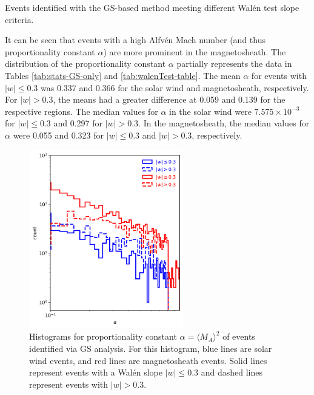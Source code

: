 \begin{table}
    \caption{Events identified with the GS-based method meeting different Wal\'en test slope criteria.}
    \centering
    
    \label{tab:walenTest-table}
\end{table}

It can be seen that events with a high Alfv\'en Mach number (and thus proportionality constant $\alpha$) are more prominent in the magnetosheath. The distribution of the proportionality constant $\alpha$ partially represents the data in Tables \ref{tab:stats-GS-only} and \ref{tab:walenTest-table}. The mean $\alpha$ for events with $|w|\leq 0.3$ was 0.337 and 0.366 for the solar wind and magnetosheath, respectively. For $|w|>0.3$, the means had a greater difference at 0.059 and 0.139 for the respective regions. The median values for $\alpha$ in the solar wind were $7.575\times 10^{-3}$ for $|w|\leq 0.3$ and 0.297 for $|w|>0.3$. In the magnetosheath, the median values for $\alpha$ were 0.055 and 0.323 for $|w|\leq 0.3$ and $|w|>0.3$, respectively.

\begin{figure}
    \centering
    \includegraphics[width=0.6\textwidth]{Figures/Histograms/histogram_alpha.png}
    \caption[Histograms for proportionality constant $\alpha = \langle M_A \rangle^2$]{Histograms for proportionality constant $\alpha = \langle M_A \rangle^2$ of events identified via GS analysis. For this histogram, blue lines are solar wind events, and red lines are magnetosheath events. Solid lines represent events with a Wal\'en slope $|w|\leq 0.3$ and dashed lines represent events with $|w|> 0.3$.}
    \label{fig:histogram-alpha}
\end{figure}

